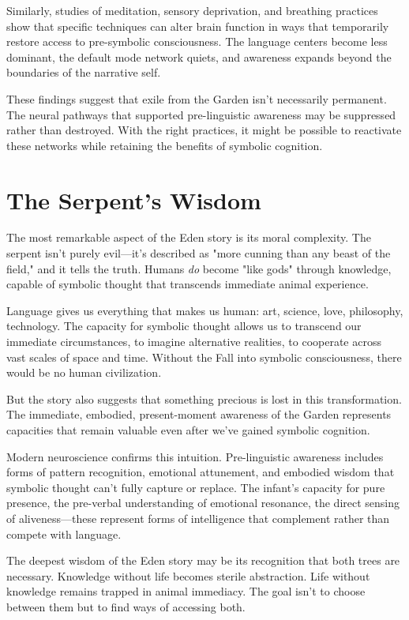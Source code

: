 \documentclass[10pt,twocolumn]{article}
\begin{document}
Similarly, studies of meditation, sensory deprivation, and breathing practices show that specific techniques can alter brain function in ways that temporarily restore access to pre-symbolic consciousness. The language centers become less dominant, the default mode network quiets, and awareness expands beyond the boundaries of the narrative self.

These findings suggest that exile from the Garden isn't necessarily permanent. The neural pathways that supported pre-linguistic awareness may be suppressed rather than destroyed. With the right practices, it might be possible to reactivate these networks while retaining the benefits of symbolic cognition.

\section{The Serpent's Wisdom}

The most remarkable aspect of the Eden story is its moral complexity. The serpent isn't purely evil—it's described as "more cunning than any beast of the field," and it tells the truth. Humans \textit{do} become "like gods" through knowledge, capable of symbolic thought that transcends immediate animal experience.

Language gives us everything that makes us human: art, science, love, philosophy, technology. The capacity for symbolic thought allows us to transcend our immediate circumstances, to imagine alternative realities, to cooperate across vast scales of space and time. Without the Fall into symbolic consciousness, there would be no human civilization.

But the story also suggests that something precious is lost in this transformation. The immediate, embodied, present-moment awareness of the Garden represents capacities that remain valuable even after we've gained symbolic cognition.

Modern neuroscience confirms this intuition. Pre-linguistic awareness includes forms of pattern recognition, emotional attunement, and embodied wisdom that symbolic thought can't fully capture or replace. The infant's capacity for pure presence, the pre-verbal understanding of emotional resonance, the direct sensing of aliveness—these represent forms of intelligence that complement rather than compete with language.

The deepest wisdom of the Eden story may be its recognition that both trees are necessary. Knowledge without life becomes sterile abstraction. Life without knowledge remains trapped in animal immediacy. The goal isn't to choose between them but to find ways of accessing both.
\end{document}
